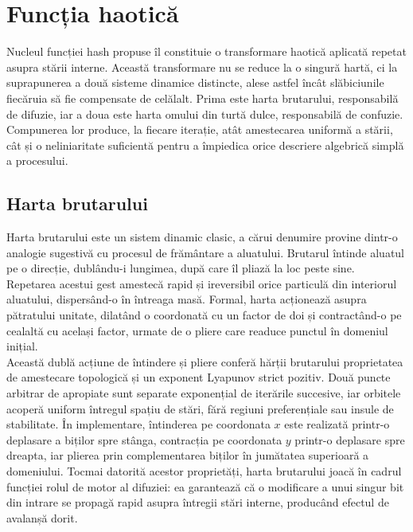 \section{Funcția haotică}

Nucleul funcției hash propuse îl constituie o transformare haotică aplicată repetat asupra stării interne.
Această transformare nu se reduce la o singură hartă, ci la suprapunerea a două sisteme dinamice distincte, alese astfel încât slăbiciunile fiecăruia să fie compensate de celălalt.
Prima este harta brutarului, responsabilă de difuzie, iar a doua este harta omului din turtă dulce, responsabilă de confuzie.
Compunerea lor produce, la fiecare iterație, atât amestecarea uniformă a stării, cât și o neliniaritate suficientă pentru a împiedica orice descriere algebrică simplă a procesului. \\

\subsection{Harta brutarului}

Harta brutarului este un sistem dinamic clasic, a cărui denumire provine dintr-o analogie sugestivă cu procesul de frământare a aluatului.
Brutarul întinde aluatul pe o direcție, dublându-i lungimea, după care îl pliază la loc peste sine.
Repetarea acestui gest amestecă rapid și ireversibil orice particulă din interiorul aluatului, dispersând-o în întreaga masă.
Formal, harta acționează asupra pătratului unitate, dilatând o coordonată cu un factor de doi și contractând-o pe cealaltă cu același factor, urmate de o pliere care readuce punctul în domeniul inițial. \\

Această dublă acțiune de întindere și pliere conferă hărții brutarului proprietatea de amestecare topologică și un exponent Lyapunov strict pozitiv.
Două puncte arbitrar de apropiate sunt separate exponențial de iterările succesive, iar orbitele acoperă uniform întregul spațiu de stări, fără regiuni preferențiale sau insule de stabilitate.
În implementare, întinderea pe coordonata $x$ este realizată printr-o deplasare a biților spre stânga, contracția pe coordonata $y$ printr-o deplasare spre dreapta, iar plierea prin complementarea biților în jumătatea superioară a domeniului.
Tocmai datorită acestor proprietăți, harta brutarului joacă în cadrul funcției rolul de motor al difuziei: ea garantează că o modificare a unui singur bit din intrare se propagă rapid asupra întregii stări interne, producând efectul de avalanșă dorit. \\

